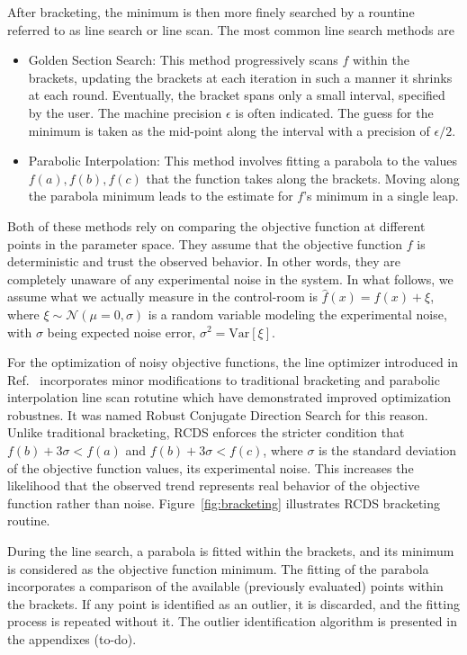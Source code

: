 After bracketing, the minimum is then more finely searched by a rountine referred to as line search or line scan. The most common line search methods are
\begin{itemize}
    \item Golden Section Search: This method progressively scans $f$ within the brackets, updating the brackets at each iteration in such a manner it shrinks at each round. Eventually, the bracket spans only a small interval, specified by the user. The machine precision $\epsilon$ is often indicated. The guess for the minimum is taken as the mid-point along the interval with a precision of $\epsilon/2$.
    \item Parabolic Interpolation: This method involves fitting a parabola to the values $f(a), f(b), f(c)$ that the function takes along the brackets. Moving along the parabola minimum leads to the estimate for $f$'s minimum in a single leap.
\end{itemize}
Both of these methods rely on comparing the objective function at different points in the parameter space. They assume that the objective function $f$ is deterministic and trust the observed behavior. In other words, they are completely unaware of any experimental noise in the system. In what follows, we assume what we actually measure in the control-room is $\hat{f}(x)=f(x) + \xi$, where $\xi\sim\mathcal{N}(\mu=0, \sigma)$ is a random variable modeling the experimental noise, with $\sigma$ being expected noise error, $\sigma^2 = \text{Var}[\xi]$.

For the optimization of noisy objective functions, the line optimizer introduced in Ref.~\cite{huang_algorithm_2013} incorporates minor modifications to traditional bracketing and parabolic interpolation line scan rotutine which have demonstrated improved optimization robustnes. It was named Robust Conjugate Direction Search for this reason. Unlike traditional bracketing, RCDS enforces the stricter condition that $f(b) + 3\sigma < f(a)$ and $f(b) + 3\sigma < f(c)$, where $\sigma$ is the standard deviation of the objective function values, its experimental noise. This increases the likelihood that the observed trend represents real behavior of the objective function rather than noise. Figure~\ref{fig:bracketing} illustrates RCDS bracketing routine.

During the line search, a parabola is fitted within the brackets, and its minimum is considered as the objective function minimum. The fitting of the parabola incorporates a comparison of the available (previously evaluated) points within the brackets. If any point is identified as an outlier, it is discarded, and the fitting process is repeated without it. The outlier identification algorithm is presented in the appendixes (to-do).

